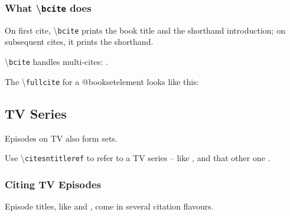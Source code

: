 \documentclass{article}
\newcommand\showcmnd[1]{%
\textbackslash\texttt{#1}%
}
\begin{document}

\subsubsection{What \showcmnd{bcite} does}
On first cite, \showcmnd{bcite} prints the book title and the shorthand introduction; on subsequent cites, it prints the shorthand.

\showcmnd{bcite} handles multi-cites: {\color{blue}}.

The \showcmnd{fullcite} for a @booksetelement looks like this:\\{\color{blue}}

\subsection{TV Series}
Episodes on TV also form sets.

Use \showcmnd{citesntitleref} to refer to a TV series -- like {\color{blue}}, and that other one {\color{blue}}.

\subsubsection{Citing TV Episodes}
Episode titles, like {\color{blue}} and {\color{blue}}, come in several citation flavours.
\end{document}
